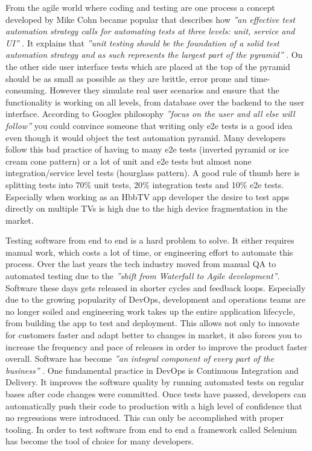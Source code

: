 From the agile world where coding and testing are one process a concept developed by Mike Cohn became popular that describes how \textit{''an effective test automation strategy calls for automating tests at three levels: unit, service and UI''} \cite{testautomation}. It explains that \textit{''unit testing should be the foundation of a solid test automation strategy and as such represents the largest part of the pyramid''} \cite{unittesting}. On the other side user interface tests which are placed at the top of the pyramid should be as small as possible as they are brittle, error prone and time-consuming. However they simulate real user scenarios and ensure that the functionality is working on all levels, from database over the backend to the user interface. According to Googles philosophy \textit{''focus on the user and all else will follow''}\cite{philogoogle} you could convince someone that writing only e2e tests is a good idea even though it would object the test automation pyramid. Many developers follow this bad practice of having to many e2e tests (inverted pyramid or ice cream cone pattern) or a lot of unit and e2e tests but almost none integration/service level tests (hourglass pattern). A good rule of thumb here is splitting tests into 70\% unit tests, 20\% integration tests and 10\% e2e tests. Especially when working as an HbbTV app developer the desire to test apps directly on multiple TVs is high due to the high device fragmentation in the market.

Testing software from end to end is a hard problem to solve. It either requires manual work, which costs a lot of time, or engineering effort to automate this process. Over the last years the tech industry moved from manual QA to automated testing due to the \textit{''shift from Waterfall to Agile development''}\cite{shifttoautomated}. Software these days gets released in shorter cycles and feedback loops. Especially due to the growing popularity of DevOps, development and operations teams are no longer soiled and engineering work takes up the entire application lifecycle, from building the app to test and deployment. This allows not only to innovate for customers faster and adapt better to changes in market, it also forces you to increase the frequency and pace of releases in order to improve the product faster overall. Software has become \textit{''an integral component of every part of the business''} \cite{devops}. One fundamental practice in DevOps is Continuous Integration and Delivery. It improves the software quality by running automated tests on regular bases after code changes were committed. Once tests have passed, developers can automatically push their code to production with a high level of confidence that no regressions were introduced. This can only be accomplished with proper tooling. In order to test software from end to end a framework called Selenium has become the tool of choice for many developers.

